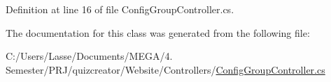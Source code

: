 Definition at line 16 of file Config\+Group\+Controller.\+cs.



The documentation for this class was generated from the following file\+:\begin{DoxyCompactItemize}
\item 
C\+:/\+Users/\+Lasse/\+Documents/\+M\+E\+G\+A/4. Semester/\+P\+R\+J/quizcreator/\+Website/\+Controllers/\hyperlink{_config_group_controller_8cs}{Config\+Group\+Controller.\+cs}\end{DoxyCompactItemize}

